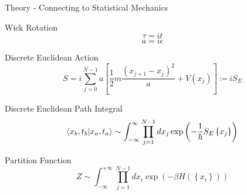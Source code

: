 \documentclass{beamer}
\begin{document}
\begin{frame}{Theory - Connecting to Statistical Mechanics}
    {
        \begin{block}{Wick Rotation}
            {
                \begin{equation}
                     \tau = it
                \end{equation}
            }
            {
                \begin{equation}
                    a = i \epsilon
                \end{equation}
            }
        \end{block}
    }
    {
        \begin{block}{Discrete Euclidean Action}
            {
                \begin{equation}
                    S = i \sum^{N-1}_{j=0} a \left[\frac{1}{2}m\frac{\left(x_{j+1}-x_j\right)^2}{a}+V\left(x_j\right)\right] \coloneqq iS_E
                \end{equation}
            }
        \end{block}
    }
    {
        \begin{block}{Discrete Euclidean Path Integral}
            {
                \begin{equation}
                    \braket{x_b,t_b|x_a,t_a} \sim \int^{\infty}_{-\infty}\prod^{N-1}_{j=1}dx_{j} \exp{\left(-\frac{1}{\hbar}S_E\left\{x_j\right\}\right)}
                \end{equation}
            }
        \end{block}
    }
    {
        \begin{block}{Partition Function}
            {
                \begin{equation}
                    Z \sim \int^{+\infty}_{-\infty} \prod^{N-1}_{j=1} dx_i \exp{\left(-\beta H\left(\left \{x_i\right \}\right)\right)}
                \end{equation}
            }
        \end{block}
    }
\end{frame}
\end{document}
